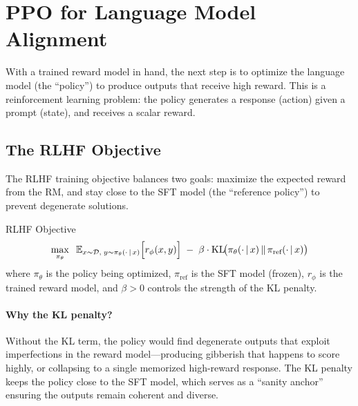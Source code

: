 \section{PPO for Language Model Alignment}
\label{sec:ppo}

With a trained reward model in hand, the next step is to optimize the
language model (the ``policy'') to produce outputs that receive high reward.
This is a reinforcement learning problem: the policy generates a response
(action) given a prompt (state), and receives a scalar reward.

\subsection{The RLHF Objective}

The RLHF training objective balances two goals: maximize the expected reward
from the RM, and stay close to the SFT model (the ``reference policy'') to
prevent degenerate solutions.

\begin{mathresult}{RLHF Objective}
\begin{equation}
\max_{\pi_\theta} \;\;
\operatorname{\mathbb{E}}_{x \sim \mathcal{D},\; y \sim \pi_\theta(\cdot \,|\, x)}
\Bigl[r_\phi(x, y)\Bigr]
\;-\; \beta \cdot \operatorname{KL}\!\bigl(\pi_\theta(\cdot \,|\, x) \,\|\, \pi_{\text{ref}}(\cdot \,|\, x)\bigr)
\label{eq:rlhf_objective}
\end{equation}
where $\pi_\theta$ is the policy being optimized, $\pi_{\text{ref}}$ is the
SFT model (frozen), $r_\phi$ is the trained reward model, and $\beta > 0$
controls the strength of the KL penalty.
\end{mathresult}

\paragraph{Why the KL penalty?}
Without the KL term, the policy would find degenerate outputs that exploit
imperfections in the reward model---producing gibberish that happens to
score highly, or collapsing to a single memorized high-reward response.
The KL penalty keeps the policy close to the SFT model, which serves as a
``sanity anchor'' ensuring the outputs remain coherent and diverse.

